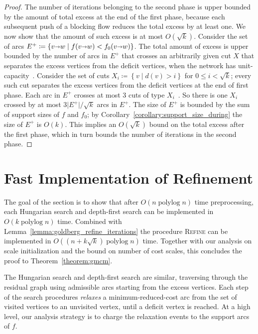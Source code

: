 \documentclass[a4paper,UKenglish]{socg-lipics-v2018}
\makeatletter
\def\polylog{\mathop{\mathrm{polylog}}}
\def\abs#1{\mathopen| #1 \mathclose|}		%
\def\Set#1{\left\{ #1 \right\}}
\def\arcto{\mathord\shortrightarrow}
\def\arc#1#2{#1\arcto#2}
\theoremstyle{plain}
\numberwithin{figure}{section}
\def\EMPH#1{\textcolor{BrickRed}{{\emph{#1}}}}
\def\n@te#1{\textsf{\boldmath \textbf{$\langle\!\langle$#1$\rangle\!\rangle$}}\leavevmode}
\def\note#1{\textcolor{red}{\n@te{#1}}}
\makeatother
\begin{document}
\begin{proof}
The number of iterations
belonging to the second phase is upper bounded by the amount of total excess at the end of the first phase, because each subsequent push of a blocking flow reduces the total excess by at least one.  We now show that the amount of such excess is at most $O(\sqrt{k})$.
%
Consider the set of arcs $E^+ \coloneqq \Set{\arc vw \mid f(\arc vw) < f_0(\arc vw)}$.
The total amount of excess is upper bounded by the number of arcs in $E^+$ that crosses an arbitrarily given cut $X$ that separates the excess vertices from the deficit vertices, when the network has unit-capacity~\cite[Lemma~3.6]{GHKT17}.
%
Consider the set of cuts $X_i \coloneqq \Set{v \mid d(v) > i}$ for $0 \le i < \sqrt{k}$; every such cut separates the excess vertices from the deficit vertices at the end of first phase.
Each arc in $E^+$ crosses at most $3$ cuts of type $X_i$~\cite[Lemma~3.1]{GHKT17}.  So there is one $X_i$ crossed by at most $3\abs{E^+}/\sqrt{k}$ arcs in $E^+$.
%
The size of $E^+$ is bounded by the sum of support sizes of $f$ and $f_0$; by Corollary~\ref{corollary:support_size_during} the size of $E^+$ is $O(k)$.
This implies an $O(\sqrt{k})$ bound on the total excess after the first phase, which in turn bounds the number of iterations in the second phase.
\end{proof}


\section{Fast Implementation of Refinement}
\label{S:implementation}

The goal of the section is to show that after $O(n \polylog n)$ time preprocessing, each Hungarian search and depth-first search can be implemented in $O(k \polylog n)$ time.
%
Combined with Lemma~\ref{lemma:goldberg_refine_iterations}
the procedure \textsc{Refine} can be implemented in $O((n+k\sqrt{k}) \polylog n)$ time.  Together with our analysis on scale initialization and the bound on number of cost scales, this concludes the proof to Theorem~\ref{theorem:gmcm}.

The Hungarian search and depth-first search are similar, traversing through the residual graph using admissible arcs starting from the excess vertices.
Each step of the search procedures \EMPH{relaxes} a minimum-reduced-cost arc from the set of visited vertices to an unvisited vertex, until a deficit vertex is reached.
%
At a high level, our analysis strategy is to charge the relaxation events to the support arcs of $f$.
\end{document}
